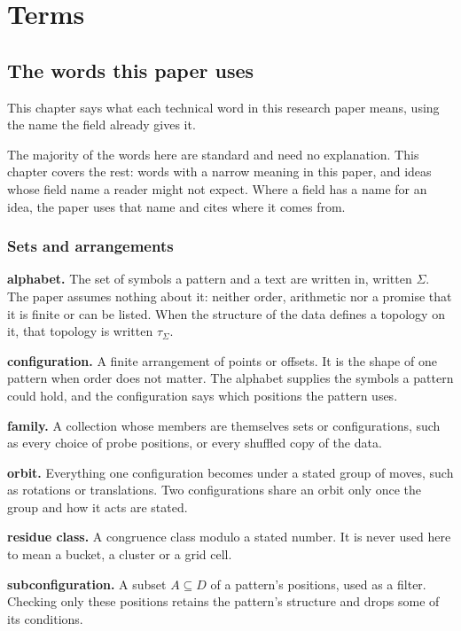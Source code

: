 \chapter{Terms}

\section{The words this paper uses}

This chapter says what each technical word in this research paper means, using the name the field already gives it.

The majority of the words here are standard and need no explanation. This chapter covers the rest: words with a narrow meaning in this paper, and ideas whose field name a reader might not expect. Where a field has a name for an idea, the paper uses that name and cites where it comes from.

\subsection{Sets and arrangements}

\noindent\textbf{alphabet.} The set of symbols a pattern and a text are written in, written \(\Sigma\). The paper assumes nothing about it: neither order, arithmetic nor a promise that it is finite or can be listed. When the structure of the data defines a topology on it, that topology is written \(\tau_\Sigma\).

\noindent\textbf{configuration.} A finite arrangement of points or offsets. It is the shape of one pattern when order does not matter. The alphabet supplies the symbols a pattern could hold, and the configuration says which positions the pattern uses.

\noindent\textbf{family.} A collection whose members are themselves sets or configurations, such as every choice of probe positions, or every shuffled copy of the data.

\noindent\textbf{orbit.} Everything one configuration becomes under a stated group of moves, such as rotations or translations. Two configurations share an orbit only once the group and how it acts are stated.

\noindent\textbf{residue class.} A congruence class modulo a stated number. It is never used here to mean a bucket, a cluster or a grid cell.

\noindent\textbf{subconfiguration.} A subset \(A \subseteq D\) of a pattern's positions, used as a filter. Checking only these positions retains the pattern's structure and drops some of its conditions.

